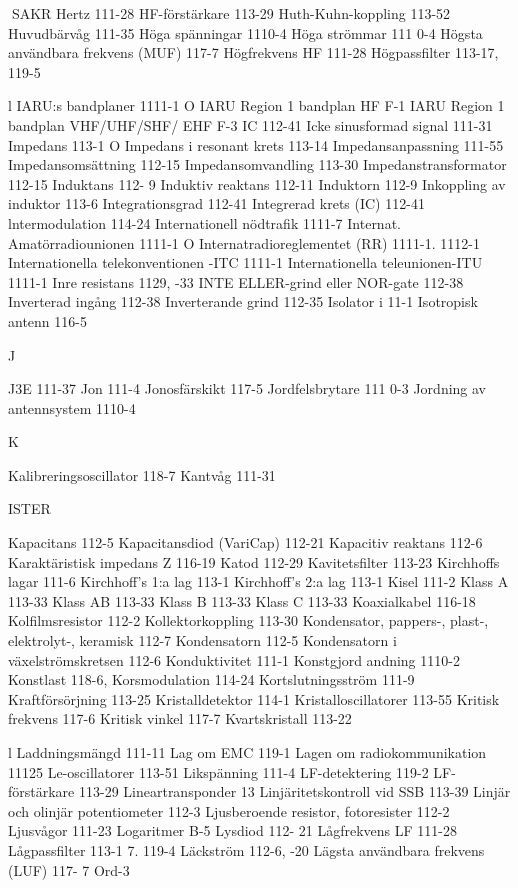 SAKR
Hertz 111-28
HF-förstärkare 113-29
Huth-Kuhn-koppling 113-52
Huvudbärvåg 111-35
Höga spänningar 1110-4
Höga strömmar 111 0-4
Högsta användbara frekvens (MUF) 117-7
Högfrekvens HF 111-28
Högpassfilter 113-17, 119-5

l
IARU:s bandplaner 1111-1 O
IARU Region 1 bandplan HF F-1
IARU Region 1 bandplan VHF/UHF/SHF/
EHF F-3
IC 112-41
Icke sinusformad signal 111-31
Impedans 113-1 O
Impedans i resonant krets 113-14
Impedansanpassning 111-55
Impedansomsättning 112-15
Impedansomvandling 113-30
Impedanstransformator 112-15
Induktans 112- 9
Induktiv reaktans 112-11
Induktorn 112-9
Inkoppling av induktor 113-6
Integrationsgrad 112-41
Integrerad krets (IC) 112-41
lntermodulation 114-24
Internationell nödtrafik 1111-7
Internat. Amatörradiounionen 1111-1 O
Internatradioreglementet (RR) 1111-1. 1112-1
Internationella telekonventionen -ITC 1111-1
Internationella teleunionen-ITU 1111-1
Inre resistans 1129, -33
INTE ELLER-grind eller NOR-gate 112-38
Inverterad ingång 112-38
Inverterande grind 112-35
Isolator i 11-1
Isotropisk antenn 116-5

J

J3E 111-37
Jon 111-4
Jonosfärskikt 117-5
Jordfelsbrytare 111 0-3
Jordning av antennsystem 1110-4

K

Kalibreringsoscillator 118-7
Kantvåg 111-31

ISTER

Kapacitans 112-5
Kapacitansdiod (VariCap) 112-21
Kapacitiv reaktans 112-6
Karaktäristisk impedans Z 116-19
Katod 112-29
Kavitetsfilter 113-23
Kirchhoffs lagar 111-6
Kirchhoff's 1:a lag 113-1
Kirchhoff's 2:a lag 113-1
Kisel 111-2
Klass A 113-33
Klass AB 113-33
Klass B 113-33
Klass C 113-33
Koaxialkabel 116-18
Kolfilmsresistor 112-2
Kollektorkoppling 113-30
Kondensator, pappers-, plast-, elektrolyt-,
keramisk 112-7
Kondensatorn 112-5
Kondensatorn i växelströmskretsen 112-6
Konduktivitet 111-1
Konstgjord andning 1110-2
Konstlast 118-6,
Korsmodulation 114-24
Kortslutningsström 111-9
Kraftförsörjning 113-25
Kristalldetektor 114-1
Kristalloscillatorer 113-55
Kritisk frekvens 117-6
Kritisk vinkel 117-7
Kvartskristall 113-22

l
Laddningsmängd 111-11
Lag om EMC 119-1
Lagen om radiokommunikation 11125
Le-oscillatorer 113-51
Likspänning 111-4
LF-detektering 119-2
LF-förstärkare 113-29
Lineartransponder 13
Linjäritetskontroll vid SSB 113-39
Linjär och olinjär potentiometer 112-3
Ljusberoende resistor, fotoresister 112-2
Ljusvågor 111-23
Logaritmer B-5
Lysdiod 112- 21
Lågfrekvens LF 111-28
Lågpassfilter 113-1 7. 119-4
Läckström 112-6, -20
Lägsta användbara frekvens (LUF) 117- 7
Ord-3

